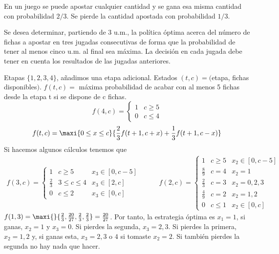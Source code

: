 \documentclass[twoside]{article}
\begin{document}
\newpage 
\begin{ejercicio}{4}
En un juego se puede apostar cualquier cantidad y se gana esa misma cantidad con probabilidad $2/3$. Se pierde la cantidad apostada con probabilidad $1/3$.

Se desea determinar, partiendo de 3 u.m., la política óptima acerca del número de fichas a apostar en tres jugadas consecutivas de forma que la probabilidad de tener al menos cinco u.m. al final sea máxima. La decisión en cada jugada debe tener en cuenta los resultados de las jugadas anteriores.
\begin{solucion}
Etapas $\{1,2,3,4\}$, añadimos una etapa adicional. Estados $(t,c)=($etapa, fichas disponibles$)$. $f(t,c)=$ máxima probabilidad de acabar con al menos 5 fichas desde la etapa t si se dispone de c fichas.  
$$f(4,c)=\begin{cases}
1 & c\geq 5\\
0 & c\leq 4
\end{cases}$$
$$f(t,c)=\maxi{0\leq x\leq c}{\frac{2}{3}f(t+1,c+x)+\frac{1}{3}f(t+1,c-x)}$$
Si hacemos algunos cálculos tenemos que
\begin{equation*}
  \begin{split}
f(3,c)=\left\{\begin{array}{lll}
1 & c\geq 5 & x_3 \in [0,c-5]\\
\frac{2}{3} & 3\leq c\leq 4 & x_3 \in [2,c]\\
0 & c\leq 2 & x_3 \in [0,c]
\end{array}\right.
  \end{split}
\quad\quad
  \begin{split}
f(2,c)=\left\{\begin{array}{lll}
1 & c\geq 5 & x_2 \in [0,c-5]\\
\frac{8}{9} & c=4 & x_2 =1\\
\frac{2}{3}& c = 3 & x_2 =0,2,3\\
\frac{4}{9}& c = 2 & x_2 = 1,2\\
0 & c\leq 1 & x_2\in [0,c]
\end{array}\right.
  \end{split}
\end{equation*} 
$f(1,3)=\maxi{}{\frac{2}{3},\frac{20}{27},\frac{2}{3},\frac{2}{3}}=\frac{20}{27}$. Por tanto, la estrategia óptima es $x_1=1$, si ganas, $x_2=1$ y $x_3=0$. Si pierdes la segunda, $x_3 = 2,3$. Si pierdes la primera, $x_2=1,2$ y, si ganas esta, $x_3 = 2,3$ o $4$ si tomaste $x_2=2$. Si también pierdes la segunda no hay nada que hacer.
\end{solucion}
\end{ejercicio}
\end{document}
